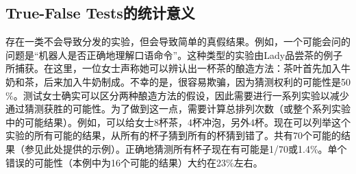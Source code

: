 
\subsection {True-False Tests的统计意义}
存在一类不会导致分发的实验，但会导致简单的真假结果。例如，一个可能会问的问题是“机器人是否正确地理解口语命令”。这种类型的实验由Lady品尝茶的例子所捕获。在这里，一位女士声称她可以辨认出一杯茶的酿造方法：茶叶首先加入牛奶和茶，后来加入牛奶制成。不幸的是，很容易欺骗，因为猜测权利的可能性是50$\%$。测试女士确实可以区分两种酿造方法的假设，因此需要进行一系列实验以减少通过猜测获胜的可能性。为了做到这一点，需要计算总排列次数（或整个系列实验中的可能结果）。例如，可以给女士8杯茶，4杯冲泡，另外4杯。现在可以列举这个实验的所有可能的结果，从所有的杯子猜到所有的杯猜到错了。共有70个可能的结果（参见此处提供的示例）。正确地猜测所有杯子现在有可能是1/70或1.4$\%$。单个错误的可能性（本例中为16个可能的结果）大约在23$\%$左右。


